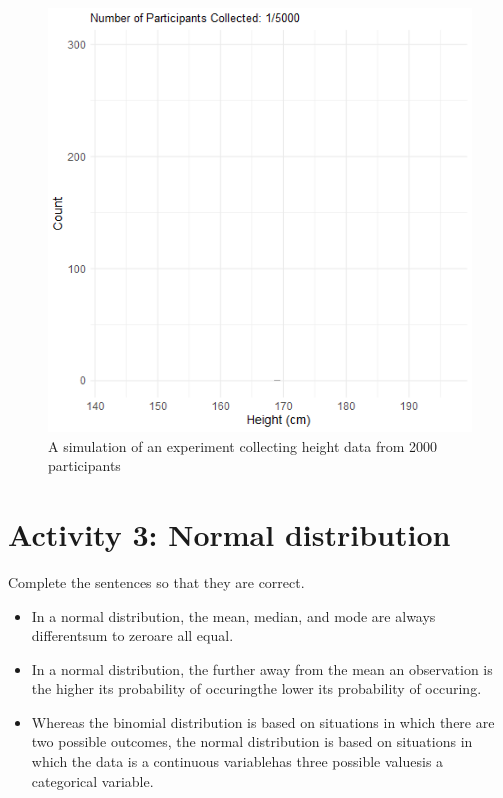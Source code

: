 \documentclass[
  oneside]{book}
\providecommand{\tightlist}{%
  \setlength{\itemsep}{0pt}\setlength{\parskip}{0pt}}
\begin{document}
\begin{figure}

{\centering \includegraphics[width=0.75\linewidth,height=0.75\textheight]{./images/normal_dist} 

}

\caption{A simulation of an experiment collecting height data from 2000 participants}\label{fig:unnamed-chunk-5}
\end{figure}

\hypertarget{activity-3-normal-distribution}{%
\section{Activity 3: Normal distribution}\label{activity-3-normal-distribution}}

Complete the sentences so that they are correct.

\begin{itemize}
\tightlist
\item
  In a normal distribution, the mean, median, and mode are always differentsum to zeroare all equal.
\item
  In a normal distribution, the further away from the mean an observation is the higher its probability of occuringthe lower its probability of occuring.
\item
  Whereas the binomial distribution is based on situations in which there are two possible outcomes, the normal distribution is based on situations in which the data is a continuous variablehas three possible valuesis a categorical variable.
\end{itemize}
\end{document}
